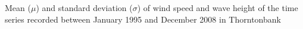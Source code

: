\label{fig:windwave}
Mean ($\mu$) and standard deviation ($\sigma$) of wind speed and wave height of the time series recorded between January 1995 and December 2008 in Thorntonbank